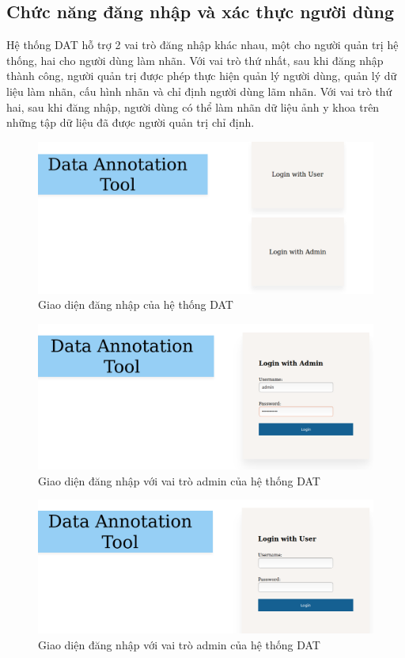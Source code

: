 \subsection{Chức năng đăng nhập và xác thực người dùng}
Hệ thống DAT hỗ trợ 2 vai trò đăng nhập khác nhau, một cho người quản trị hệ thống, hai cho người dùng làm nhãn. Với vai trò thứ nhất, sau khi đăng nhập thành công, người quản trị được phép thực hiện quản lý người dùng, quản lý dữ liệu làm nhãn, cấu hình nhãn và chỉ định người dùng lãm nhãn. Với vai trò thứ hai, sau khi đăng nhập, người dùng có thể  làm nhãn dữ liệu ảnh y khoa trên những tập dữ liệu đã được người quản trị chỉ định. 
\begin{figure}[H]
    \centering
    \includegraphics[width=14cm]{images/chapter-07-images/ui-dang-nhap.png}
    \caption{Giao diện đăng nhập của hệ thống DAT}
\end{figure}
\begin{figure}[H]
    \centering
    \includegraphics[width=14cm]{images/chapter-07-images/ui-dang-nhap-admin.png}
    \caption{Giao diện đăng nhập với vai trò admin của hệ thống DAT}
\end{figure}
\begin{figure}[H]
    \centering
    \includegraphics[width=14cm]{images/chapter-07-images/ui-dang-nhap-user.png}
    \caption{Giao diện đăng nhập với vai trò admin của hệ thống DAT}
\end{figure}


